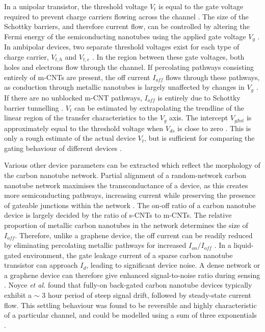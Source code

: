 \documentclass[
  a4paper,
]{scrbook}
\begin{document}
In a unipolar transistor, the threshold voltage \(V_t\) is equal to the
gate voltage required to prevent charge carriers flowing across the
channel \autocite{Petti2016,Shkodra2021}. The size of the Schottky
barriers, and therefore current flow, can be controlled by altering the
Fermi energy of the semiconducting nanotubes using the applied gate
voltage \(V_g\) \autocite{Nakanishi2002,Avouris2007,Heller2008}. In
ambipolar devices, two separate threshold voltages exist for each type
of charge carrier, \(V_{t,h}\) and \(V_{t,e}\)
\autocite{Reiner-Rozman2015}. In the region between these gate voltages,
both holes and electrons flow through the channel. If percolating
pathways consisting entirely of m-CNTs are present, the off current
\(I_{off}\) flows through these pathways, as conduction through metallic
nanotubes is largely unaffected by changes in \(V_g\)
\autocite{Fuhrer2000,Topinka2009}. If there are no unblocked m-CNT
pathways, \(I_{off}\) is entirely due to Schottky barrier tunnelling
\autocite{Avouris2007}. \(V_t\) can be estimated by extrapolating the
trendline of the linear region of the transfer characteristics to the
\(V_g\) axis. The intercept \(V_{gInt}\) is approximately equal to the
threshold voltage when \(V_{ds}\) is close to zero
\autocite{Petti2016,Li2023}. This is only a rough estimate of the actual
device \(V_t\), but is sufficient for comparing the gating behaviour of
different devices \autocite{Li2023}.

Various other device parameters can be extracted which reflect the
morphology of the carbon nanotube network. Partial alignment of a
random-network carbon nanotube network maximises the transconductance of
a device, as this creates more semiconducting pathways, increasing
current while preserving the presence of gateable junctions within the
network \autocite{Cao2009,Rouhi2010,Rouhi2011a,Jang2015,Li2023}. The
on-off ratio of a carbon nanotube device is largely decided by the ratio
of s-CNTs to m-CNTs. The relative proportion of metallic carbon
nanotubes in the network determines the size of \(I_{off}\). Therefore,
unlike a graphene device, the off current can be readily reduced by
eliminating percolating metallic pathways for increased
\(I_{on}/I_{off}\) \autocite{Hu2004,Cao2009,Rouhi2010,Rouhi2011a}. In a
liquid-gated environment, the gate leakage current of a sparse carbon
nanotube transistor can approach \(I_d\), leading to significant device
noise. A dense network or a graphene device can therefore give enhanced
signal-to-noise ratio during sensing \autocite{Ohno2015}. Noyce \emph{et
al.} found that fully-on back-gated carbon nanotube devices typically
exhibit a \(\sim\) 3 hour period of steep signal drift, followed by
steady-state current flow. This settling behaviour was found to be
reversible and highly characteristic of a particular channel, and could
be modelled using a sum of three exponentials \autocite{Noyce2019}.
\end{document}
